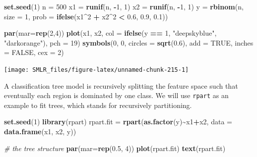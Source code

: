 \documentclass[
]{book}
\newenvironment{Shaded}{\begin{snugshade}}{\end{snugshade}}
\newcommand{\AttributeTok}[1]{\textcolor[rgb]{0.13,0.29,0.53}{#1}}
\newcommand{\CommentTok}[1]{\textcolor[rgb]{0.56,0.35,0.01}{\textit{#1}}}
\newcommand{\ConstantTok}[1]{\textcolor[rgb]{0.56,0.35,0.01}{#1}}
\newcommand{\DecValTok}[1]{\textcolor[rgb]{0.00,0.00,0.81}{#1}}
\newcommand{\FloatTok}[1]{\textcolor[rgb]{0.00,0.00,0.81}{#1}}
\newcommand{\FunctionTok}[1]{\textcolor[rgb]{0.13,0.29,0.53}{\textbf{#1}}}
\newcommand{\NormalTok}[1]{#1}
\newcommand{\OtherTok}[1]{\textcolor[rgb]{0.56,0.35,0.01}{#1}}
\newcommand{\SpecialCharTok}[1]{\textcolor[rgb]{0.81,0.36,0.00}{\textbf{#1}}}
\newcommand{\StringTok}[1]{\textcolor[rgb]{0.31,0.60,0.02}{#1}}
\theoremstyle{definition}
\theoremstyle{definition}
\theoremstyle{definition}
\theoremstyle{definition}
\theoremstyle{remark}
\begin{document}
\begin{Shaded}
\begin{Highlighting}[]
    \FunctionTok{set.seed}\NormalTok{(}\DecValTok{1}\NormalTok{)}
\NormalTok{    n }\OtherTok{=} \DecValTok{500}
\NormalTok{    x1 }\OtherTok{=} \FunctionTok{runif}\NormalTok{(n, }\SpecialCharTok{{-}}\DecValTok{1}\NormalTok{, }\DecValTok{1}\NormalTok{)}
\NormalTok{    x2 }\OtherTok{=} \FunctionTok{runif}\NormalTok{(n, }\SpecialCharTok{{-}}\DecValTok{1}\NormalTok{, }\DecValTok{1}\NormalTok{)}
\NormalTok{    y }\OtherTok{=} \FunctionTok{rbinom}\NormalTok{(n, }\AttributeTok{size =} \DecValTok{1}\NormalTok{, }\AttributeTok{prob =} \FunctionTok{ifelse}\NormalTok{(x1}\SpecialCharTok{\^{}}\DecValTok{2} \SpecialCharTok{+}\NormalTok{ x2}\SpecialCharTok{\^{}}\DecValTok{2} \SpecialCharTok{\textless{}} \FloatTok{0.6}\NormalTok{, }\FloatTok{0.9}\NormalTok{, }\FloatTok{0.1}\NormalTok{))}
    
    \FunctionTok{par}\NormalTok{(}\AttributeTok{mar=}\FunctionTok{rep}\NormalTok{(}\DecValTok{2}\NormalTok{,}\DecValTok{4}\NormalTok{))}
    \FunctionTok{plot}\NormalTok{(x1, x2, }\AttributeTok{col =} \FunctionTok{ifelse}\NormalTok{(y }\SpecialCharTok{==} \DecValTok{1}\NormalTok{, }\StringTok{"deepskyblue"}\NormalTok{, }\StringTok{"darkorange"}\NormalTok{), }\AttributeTok{pch =} \DecValTok{19}\NormalTok{)}
    \FunctionTok{symbols}\NormalTok{(}\DecValTok{0}\NormalTok{, }\DecValTok{0}\NormalTok{, }\AttributeTok{circles =} \FunctionTok{sqrt}\NormalTok{(}\FloatTok{0.6}\NormalTok{), }\AttributeTok{add =} \ConstantTok{TRUE}\NormalTok{, }\AttributeTok{inches =} \ConstantTok{FALSE}\NormalTok{, }\AttributeTok{cex =} \DecValTok{2}\NormalTok{)}
\end{Highlighting}
\end{Shaded}

\begin{center}\texttt{[image: SMLR\_files/figure-latex/unnamed-chunk-215-1]} \end{center}

A classification tree model is recursively splitting the feature space such that eventually each region is dominated by one class. We will use \texttt{rpart} as an example to fit trees, which stands for recursively partitioning.

\begin{Shaded}
\begin{Highlighting}[]
    \FunctionTok{set.seed}\NormalTok{(}\DecValTok{1}\NormalTok{)}
    \FunctionTok{library}\NormalTok{(rpart)}
\NormalTok{    rpart.fit }\OtherTok{=} \FunctionTok{rpart}\NormalTok{(}\FunctionTok{as.factor}\NormalTok{(y)}\SpecialCharTok{\textasciitilde{}}\NormalTok{x1}\SpecialCharTok{+}\NormalTok{x2, }\AttributeTok{data =} \FunctionTok{data.frame}\NormalTok{(x1, x2, y))}
    
    \CommentTok{\# the tree structure    }
    \FunctionTok{par}\NormalTok{(}\AttributeTok{mar=}\FunctionTok{rep}\NormalTok{(}\FloatTok{0.5}\NormalTok{, }\DecValTok{4}\NormalTok{))}
    \FunctionTok{plot}\NormalTok{(rpart.fit)}
    \FunctionTok{text}\NormalTok{(rpart.fit)    }
\end{Highlighting}
\end{Shaded}
\end{document}
